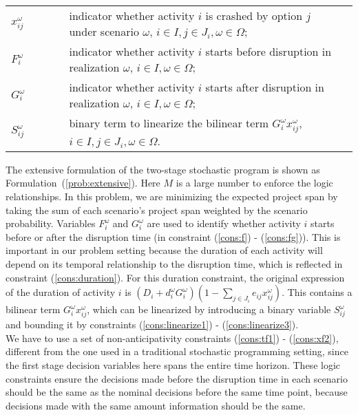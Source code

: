 \documentclass[11pt]{article}
\newcommand{\noi}{\noindent}
\begin{document}
\begin{table}[H]
\begin{tabular}{ l l l l }
			\(x_{ij}^\omega\) & \(\qquad\) & indicator whether activity \(i\) is crashed by option \(j\) under scenario \(\omega\), \(i \in I, j \in J_i, \omega \in \Omega \); &\\
			\(F_i^\omega\) & \(\qquad\) & indicator whether activity \(i\) starts before disruption in realization \(\omega\), \(i \in I, \omega \in \Omega\);&\\
			\(G_i^\omega\) & \(\qquad\) & indicator whether activity \(i\) starts after disruption in realization \(\omega\), \(i \in I, \omega \in \Omega\);&\\
			\(S_{ij}^\omega\) & \(\qquad\) & binary term to linearize the bilinear term \(G_i^\omega x_{ij}^\omega\), \(i \in I, j \in J_{i}, \omega \in \Omega\).&\\
		\end{tabular}
	\end{table}
	\noi The extensive formulation of the two-stage stochastic program is shown as Formulation~(\ref{prob:extensive}). Here \(M\) is a large number to enforce the logic relationships. In this problem, we are minimizing the expected project span by taking the sum of each scenario's project span weighted by the scenario probability. Variables \(F^\omega_i\) and \(G^\omega_i\) are used to identify whether activity \(i\) starts before or after the disruption time (in constraint (\ref{cons:f}) - (\ref{cons:fg})). This is important in our problem setting because the duration of each activity will depend on its temporal relationship to the disruption time, which is reflected in constraint (\ref{cons:duration}). For this duration constraint, the original expression of the duration of activity \(i\) is \((D_i + d_i^\omega G_i^\omega)(1 - \sum_{j \in J_i} e_{ij}x_{ij}^\omega)\). This contains a bilinear term \(G_i^\omega x_{ij}^\omega\), which can be linearized by introducing a binary variable \(S_{ij}^\omega\) and bounding it by constraints (\ref{cons:linearize1}) - (\ref{cons:linearize3}).\\
	\newline
	We have to use a set of non-anticipativity constraints (\ref{cons:tf1}) - (\ref{cons:xf2}), different from the one used in a traditional stochastic programming setting, since the first stage decision variables here spans the entire time horizon. These logic constraints ensure the decisions made before the disruption time in each scenario should be the same as the nominal decisions before the same time point, because decisions made with the same amount information should be the same.\\
\end{document}
